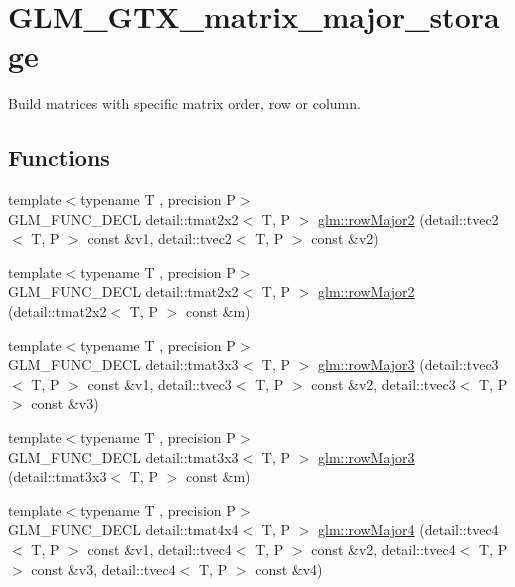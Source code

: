 \hypertarget{group__gtx__matrix__major__storage}{}\section{G\+L\+M\+\_\+\+G\+T\+X\+\_\+matrix\+\_\+major\+\_\+storage}
\label{group__gtx__matrix__major__storage}


Build matrices with specific matrix order, row or column.  


\subsection*{Functions}
\begin{DoxyCompactItemize}
\item 
{\footnotesize template$<$typename T , precision P$>$ }\\G\+L\+M\+\_\+\+F\+U\+N\+C\+\_\+\+D\+E\+CL detail\+::tmat2x2$<$ T, P $>$ \hyperlink{group__gtx__matrix__major__storage_ga63d72819ad07f4f875a0565f1462652b}{glm\+::row\+Major2} (detail\+::tvec2$<$ T, P $>$ const \&v1, detail\+::tvec2$<$ T, P $>$ const \&v2)
\item 
{\footnotesize template$<$typename T , precision P$>$ }\\G\+L\+M\+\_\+\+F\+U\+N\+C\+\_\+\+D\+E\+CL detail\+::tmat2x2$<$ T, P $>$ \hyperlink{group__gtx__matrix__major__storage_ga5e3cee7cdc09b9ebf0e072247a5eac54}{glm\+::row\+Major2} (detail\+::tmat2x2$<$ T, P $>$ const \&m)
\item 
{\footnotesize template$<$typename T , precision P$>$ }\\G\+L\+M\+\_\+\+F\+U\+N\+C\+\_\+\+D\+E\+CL detail\+::tmat3x3$<$ T, P $>$ \hyperlink{group__gtx__matrix__major__storage_gaacbbf46215dff1c3da9599916ba04a94}{glm\+::row\+Major3} (detail\+::tvec3$<$ T, P $>$ const \&v1, detail\+::tvec3$<$ T, P $>$ const \&v2, detail\+::tvec3$<$ T, P $>$ const \&v3)
\item 
{\footnotesize template$<$typename T , precision P$>$ }\\G\+L\+M\+\_\+\+F\+U\+N\+C\+\_\+\+D\+E\+CL detail\+::tmat3x3$<$ T, P $>$ \hyperlink{group__gtx__matrix__major__storage_gafb5e7381b2451a85db394c457c284fb7}{glm\+::row\+Major3} (detail\+::tmat3x3$<$ T, P $>$ const \&m)
\item 
{\footnotesize template$<$typename T , precision P$>$ }\\G\+L\+M\+\_\+\+F\+U\+N\+C\+\_\+\+D\+E\+CL detail\+::tmat4x4$<$ T, P $>$ \hyperlink{group__gtx__matrix__major__storage_gaba5dbb8fa29fcf57c80daf43ca7cf9db}{glm\+::row\+Major4} (detail\+::tvec4$<$ T, P $>$ const \&v1, detail\+::tvec4$<$ T, P $>$ const \&v2, detail\+::tvec4$<$ T, P $>$ const \&v3, detail\+::tvec4$<$ T, P $>$ const \&v4)

\end{DoxyCompactItemize}
